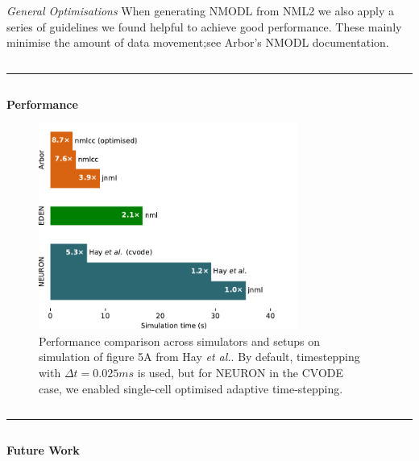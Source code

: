 \documentclass{beamer}
\begin{document}
\begin{frame}[t, fragile]
\begin{columns}[t]
\begin{column}{0.49\textwidth}
      \emph{General Optimisations} When generating NMODL from NML2 we also apply
      a series of guidelines we found helpful to achieve good performance. These
      mainly minimise the amount of data movement;\@ see Arbor's NMODL
      documentation.
    \end{column}
  \end{columns}
  \vspace*{1ex}
  \textcolor{arborange}{\rule{\textwidth}{0.5ex}}
  \vspace*{-1ex}
  \begin{columns}
    \begin{column}{0.49\textwidth}
      \textbf{Performance}
      \begin{figure}[h]
        \centering
        \includegraphics[width=0.8\textwidth]{./benchmark/barchart.pdf}
          \caption{Performance comparison across simulators and setups on
                   simulation of figure 5A from Hay \emph{et al.}.
                   By default, timestepping with $\Delta t = 0.025ms$
                   is used, but for NEURON in the CVODE case, we enabled
                   single-cell optimised adaptive time-stepping.}
        \label{fig:bar}
      \end{figure}
    \end{column}
    \begin{column}{0.49\textwidth}
    \end{column}
  \end{columns}
  \vspace*{1ex}
  \textcolor{arbred}{\rule{\textwidth}{0.5ex}}
  \vspace*{-1ex}
  \begin{columns}[t]
    \begin{column}[t]{0.49\textwidth}
      \textbf{Future Work}


\end{column}
\end{columns}
\end{frame}
\end{document}
